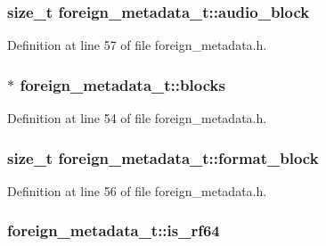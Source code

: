 \subsubsection[{\texorpdfstring{audio\+\_\+block}{audio_block}}]{\setlength{\rightskip}{0pt plus 5cm}size\+\_\+t foreign\+\_\+metadata\+\_\+t\+::audio\+\_\+block}\hypertarget{structforeign__metadata__t_a2227965751ca2a45da38db2815e83ce0}{}\label{structforeign__metadata__t_a2227965751ca2a45da38db2815e83ce0}


Definition at line 57 of file foreign\+\_\+metadata.\+h.

\subsubsection[{\texorpdfstring{blocks}{blocks}}]{$\ast$ foreign\+\_\+metadata\+\_\+t\+::blocks}\hypertarget{structforeign__metadata__t_a07ffebed0bd84bda92cc9bde6b2216fd}{}\label{structforeign__metadata__t_a07ffebed0bd84bda92cc9bde6b2216fd}


Definition at line 54 of file foreign\+\_\+metadata.\+h.

\subsubsection[{\texorpdfstring{format\+\_\+block}{format_block}}]{\setlength{\rightskip}{0pt plus 5cm}size\+\_\+t foreign\+\_\+metadata\+\_\+t\+::format\+\_\+block}\hypertarget{structforeign__metadata__t_a33ea5938474710ede5dbc6764304bc3b}{}\label{structforeign__metadata__t_a33ea5938474710ede5dbc6764304bc3b}


Definition at line 56 of file foreign\+\_\+metadata.\+h.

\subsubsection[{\texorpdfstring{is\+\_\+rf64}{is_rf64}}]{ foreign\+\_\+metadata\+\_\+t\+::is\+\_\+rf64}\hypertarget{structforeign__metadata__t_a0bfa5e2f3369a58dec8df6cf67ccf593}{}\label{structforeign__metadata__t_a0bfa5e2f3369a58dec8df6cf67ccf593}


